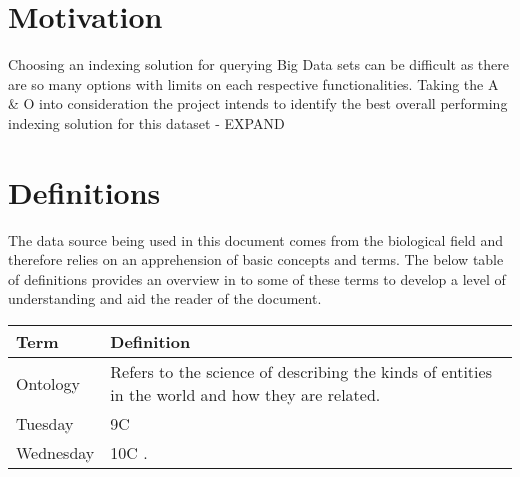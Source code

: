 \section{Motivation}
Choosing an indexing solution for querying Big Data sets can be difficult as there are so many options with limits on each respective functionalities. Taking the A \& O into consideration the project intends to identify the best overall performing indexing solution for this dataset - EXPAND
\section{Definitions}
The data source being used in this document comes from the biological field and therefore relies on an apprehension of basic concepts and terms. The below table of definitions provides an overview in to some of these terms to develop a level of understanding and aid the reader of the document.
 
\begin{center}
    \begin{tabular}{ | l | p{10cm}|}
    \hline
    Term & Definition \\ \hline
    Ontology & Refers to the science of describing the kinds of entities in the world and how they are related. \\ \hline
    Tuesday & 9C \\ \hline
    Wednesday & 10C . \\
    \hline
    \end{tabular}
\end{center}





